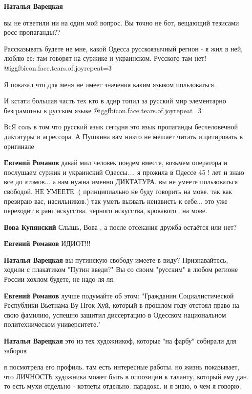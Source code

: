 \begin{itemize}
\begin{itemize}
\textbf{Наталья Варецкая} 

вы не ответили ни на один мой вопрос. Вы точно не бот, вещающий тезисами росс
пропаганды??

Рассказывать будете не мне, какой Одесса русскоязычный регион - я жил в ней,
люблю ее: там говорят на суржике и украинском. Русского там нет!  @igg{fbicon.face.tears.of.joy}{repeat=3} 

Я показал что для меня не имеет значения каким языком пользоваться.

И кстати большая часть тех кто в лднр топил за русский мир элементарно
безграмотны в русском языке  @igg{fbicon.face.tears.of.joy}{repeat=3} 

ВсЯ соль в том что русский язык сегодня это язык пропаганды бесчеловечной
диктатуры и агрессора. А Пушкина вам никто не мешает читать и цитировать в
оригинале

\textbf{Евгений Романов} давай мил человек поедем вместе, возьмем оператора и послушаем суржик и украинский Одессы.... я прожила в Одессе 45 ! лет и знаю все до атомов...
а вам нужна именно ДИКТАТУРА. вы не умеете пользоваться свободой. НЕ УМЕЕТЕ.
( принципиально не буду говорить на мове. так как презираю вас, насильников.)
так уметь вызвать ненависть к себе... это уже переходит в ранг искусства. черного искусства, кровавого..
на мове.

\textbf{Вова Купянский} Слышь, Вова , а после отсекания дружба остаётся или нет?

\textbf{Евгений Романов} ИДИОТ!!!

\textbf{Наталья Варецкая} вы путинскую свободу имеете в виду? Признавайтесь, ходили с плакатиком "Путин введи?"
Вы со своим "русским" в любом регионе России хохлом будете, не надо ля-ля.

\textbf{Евгений Романов} лучше подумайте об этом:
"Гражданин Социалистической Республики Вьетнама Ву Нгок Хуй, который в прошлом году отстоял право на свою фамилию, успешно защитил диссертацию в Одесском национальном политехническом университете."

\textbf{Наталья Варецкая} это из тех художникоф, которые "на фарбу" собирали для заборов

я посмотрела его профиль. там есть интересные работы.
но жизнь показывает, что ЛИЧНОСТЬ художника может быть в оппозиции к таланту, который ему дан. то есть мухи отдельно - котлеты отдельно. парадокс.
и я знаю, о чем я говорю.


\end{itemize}
\end{itemize}
